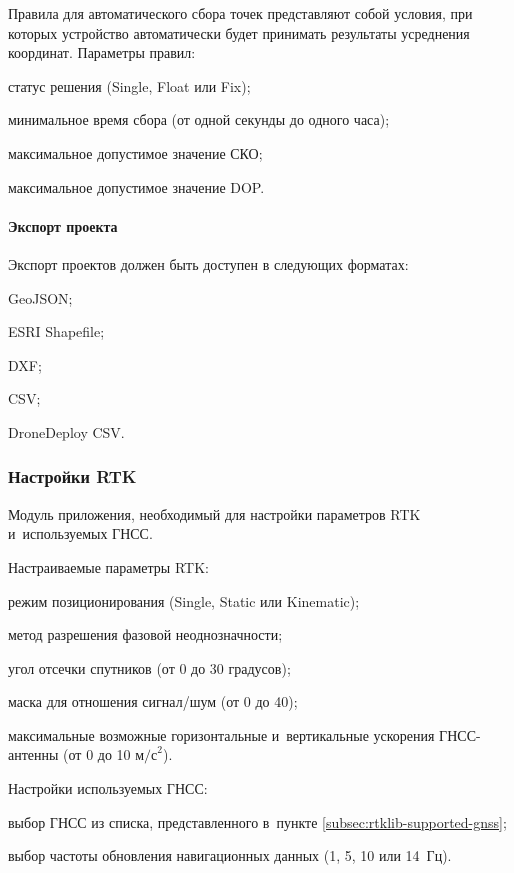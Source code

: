 Правила для автоматического сбора точек представляют собой условия, при которых устройство автоматически будет принимать результаты усреднения координат. Параметры правил:
\begin{dashitemize}
  \item статус решения (Single, Float или Fix);
  \item минимальное время сбора (от одной секунды до одного часа);
  \item максимальное допустимое значение СКО;
  \item максимальное допустимое значение DOP.
\end{dashitemize}

\paragraph{Экспорт проекта}

Экспорт проектов должен быть доступен в следующих форматах:
\begin{dashitemize}
  \item GeoJSON;
  \item ESRI Shapefile;
  \item DXF;
  \item CSV;
  \item DroneDeploy CSV.
\end{dashitemize}


\subsubsection{Настройки RTK}

Модуль приложения, необходимый для настройки параметров RTK и~используемых ГНСС.

Настраиваемые параметры RTK:
\begin{dashitemize}
  \item режим позиционирования (Single, Static или Kinematic);
  \item метод разрешения фазовой неоднозначности;
  \item угол отсечки спутников (от 0 до 30 градусов);
  \item маска для отношения сигнал/шум (от 0 до 40);
  \item максимальные возможные горизонтальные и~вертикальные ускорения ГНСС-антенны (от 0 до 10 $\text{м/с}^{2}$).
\end{dashitemize}

Настройки используемых ГНСС:
\begin{dashitemize}
  \item выбор ГНСС из списка, представленного в~пункте \ref{subsec:rtklib-supported-gnss};
  \item выбор частоты обновления навигационных данных (1, 5, 10 или 14~Гц).
\end{dashitemize}

